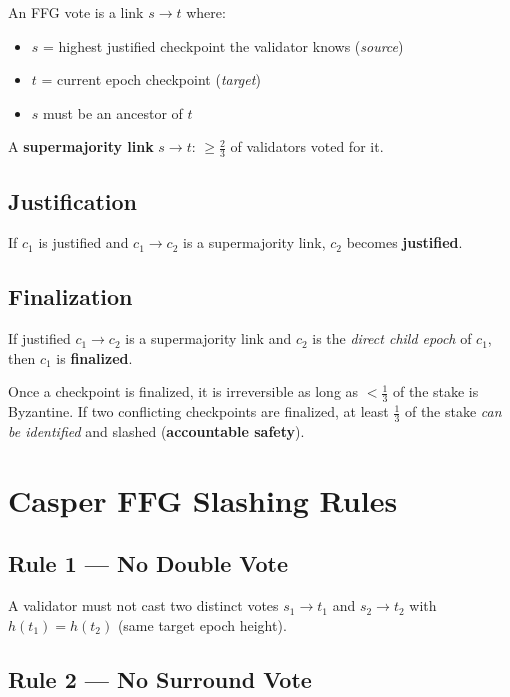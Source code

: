 \documentclass[12pt,a4paper,openany]{book}
\theoremstyle{definition}
\theoremstyle{plain}
\theoremstyle{remark}
\begin{document}
An FFG vote is a link $s\to t$ where:
\begin{itemize}
  \item $s$ = highest justified checkpoint the validator knows (\emph{source})
  \item $t$ = current epoch checkpoint (\emph{target})
  \item $s$ must be an ancestor of $t$
\end{itemize}

A \textbf{supermajority link} $s\to t$: $\geq\frac{2}{3}$ of validators
voted for it.

\subsection{Justification}

If $c_1$ is justified and $c_1\to c_2$ is a supermajority link,
$c_2$ becomes \textbf{justified}.

\subsection{Finalization}

If justified $c_1\to c_2$ is a supermajority link and $c_2$ is the
\emph{direct child epoch} of $c_1$, then $c_1$ is \textbf{finalized}.

\begin{keyinsight}
  Once a checkpoint is finalized, it is irreversible as long as
  $<\frac{1}{3}$ of the stake is Byzantine.
  If two conflicting checkpoints are finalized, at least $\frac{1}{3}$
  of the stake \emph{can be identified} and slashed
  (\textbf{accountable safety}).
\end{keyinsight}

\section{Casper FFG Slashing Rules}

\subsection{Rule 1 — No Double Vote}

A validator must not cast two distinct votes $s_1\to t_1$ and
$s_2\to t_2$ with $h(t_1)=h(t_2)$ (same target epoch height).

\subsection{Rule 2 — No Surround Vote}
\end{document}
